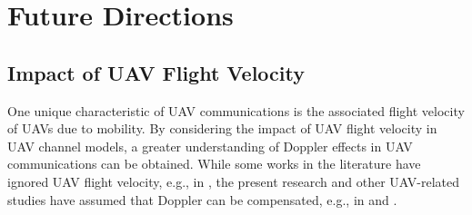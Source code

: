 %

\section{Future Directions}

\subsection{Impact of UAV Flight Velocity}

One unique characteristic of UAV communications is the associated flight velocity of UAVs due to mobility. By considering the impact of UAV flight velocity in UAV channel models, a greater understanding of Doppler effects in UAV communications can be obtained. While some works in the literature have ignored UAV flight velocity, e.g., in \cite{azari2018ultra}, the present research and other UAV-related studies have assumed that Doppler can be compensated, e.g., in \cite{lyu2017spectrum} and \cite{zeng2016wireless}.

